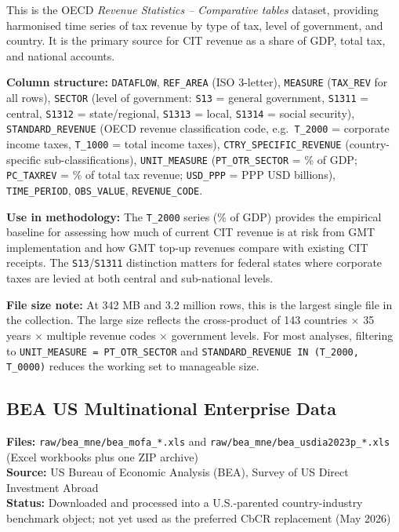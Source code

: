 \documentclass[11pt,a4paper]{article}
\newcommand{\code}[1]{\texttt{#1}}
\begin{document}
This is the OECD \emph{Revenue Statistics -- Comparative tables} dataset, providing harmonised time series of tax revenue by type of tax, level of government, and country.  It is the primary source for CIT revenue as a share of GDP, total tax, and national accounts.

\noindent\textbf{Column structure:} \texttt{DATAFLOW}, \texttt{REF\_AREA} (ISO 3-letter), \texttt{MEASURE} (\code{TAX\_REV} for all rows), \texttt{SECTOR} (level of government: \texttt{S13} = general government, \texttt{S1311} = central, \texttt{S1312} = state/regional, \texttt{S1313} = local, \texttt{S1314} = social security), \texttt{STANDARD\_REVENUE} (OECD revenue classification code, e.g.\ \texttt{T\_2000} = corporate income taxes, \texttt{T\_1000} = total income taxes), \texttt{CTRY\_SPECIFIC\_REVENUE} (country-specific sub-classifications), \texttt{UNIT\_MEASURE} (\texttt{PT\_OTR\_SECTOR} = \% of GDP; \texttt{PC\_TAXREV} = \% of total tax revenue; \texttt{USD\_PPP} = PPP USD billions), \texttt{TIME\_PERIOD}, \texttt{OBS\_VALUE}, \texttt{REVENUE\_CODE}.

\noindent\textbf{Use in methodology:} The \texttt{T\_2000} series (\% of GDP) provides the empirical baseline for assessing how much of current CIT revenue is at risk from GMT implementation and how GMT top-up revenues compare with existing CIT receipts.  The \texttt{S13}/\texttt{S1311} distinction matters for federal states where corporate taxes are levied at both central and sub-national levels.

\noindent\textbf{File size note:} At 342 MB and 3.2 million rows, this is the largest single file in the collection.  The large size reflects the cross-product of 143 countries $\times$ 35 years $\times$ multiple revenue codes $\times$ government levels.  For most analyses, filtering to \texttt{UNIT\_MEASURE = PT\_OTR\_SECTOR} and \texttt{STANDARD\_REVENUE IN (T\_2000, T\_0000)} reduces the working set to manageable size.

\subsection{BEA US Multinational Enterprise Data}\label{sec:bea}

\textbf{Files:} \texttt{raw/bea\_mne/bea\_mofa\_*.xls} and \texttt{raw/bea\_mne/bea\_usdia2023p\_*.xls} (Excel workbooks plus one ZIP archive)\\
\textbf{Source:} US Bureau of Economic Analysis (BEA), Survey of US Direct Investment Abroad \citep{bea2025usmne}\\
\textbf{Status:} Downloaded and processed into a U.S.-parented country-industry benchmark object; not yet used as the preferred CbCR replacement (May 2026)
\end{document}
